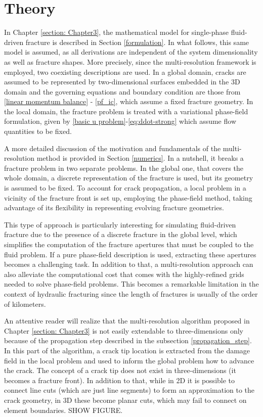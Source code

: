 \section{Theory}
\label{section: Chapter4/theory}

In Chapter \ref{section: Chapter3}, the mathematical model for single-phase fluid-driven fracture is described in Section \ref{formulation}. In what follows, this same model is assumed, as all derivations are independent of the system dimensionality as well as fracture shapes. More precisely, since the multi-resolution framework is employed, two coexisting descriptions are used. In a global domain, cracks are assumed to be represented by two-dimensional surfaces embedded in the 3D domain and the governing equations and boundary condition are those from \eqref{linear momentum balance} - \eqref{pf_ic}, which assume a fixed fracture geometry. In the local domain, the fracture problem is treated with a variational phase-field formulation, given by \eqref{basic u problem}-\eqref{eq:ddot-strong} which assume flow quantities to be fixed.

A more detailed discussion of the motivation and fundamentals of the multi-resolution method is provided in Section \ref{numerics}. In a nutshell, it breaks a fracture problem in two separate problems. In the global one, that covers the whole domain, a discrete representation of the fracture is used, but its geometry is assumed to be fixed. To account for crack propagation, a local problem in a vicinity of the fracture front is set up, employing the phase-field method, taking advantage of its flexibility in representing evolving fracture geometries.

This type of approach is particularly interesting for simulating fluid-driven fracture due to the presence of a discrete fracture in the global level, which simplifies the computation of the fracture apertures that must be coupled to the fluid problem. If a pure phase-field description is used, extracting these apertures becomes a challenging task. In addition to that, a multi-resolution approach can also alleviate the computational cost that comes with the highly-refined grids needed to solve phase-field problems. This becomes a remarkable limitation in the context of hydraulic fracturing since the length of fractures is usually of the order of kilometers.

An attentive reader will realize that the multi-resolution algorithm proposed in Chapter \ref{section: Chapter3} is not easily extendable to three-dimensions only because of the propagation step described in the subsection \ref{propagation_step}. In this part of the algorithm, a crack tip location is extracted from the damage field in the local problem and used to inform the global problem how to advance the crack. The concept of a crack tip does not exist in three-dimensions (it becomes a fracture front). In addition to that, while in 2D it is possible to connect line cuts (which are just line segments) to form an approximation to the crack geometry, in 3D these become planar cuts, which may fail to connect on element boundaries. SHOW FIGURE. 


